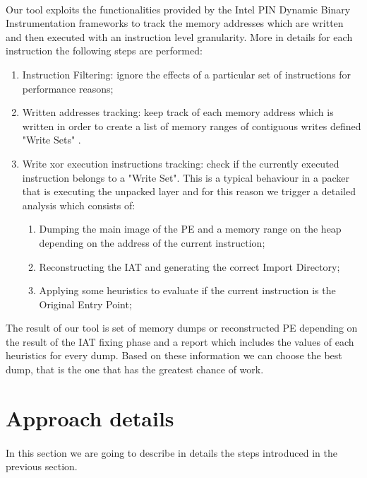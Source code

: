 \paragraph{}
Our tool exploits the functionalities provided by the Intel PIN Dynamic Binary Instrumentation frameworks to track the memory addresses which are written and then executed with an instruction level granularity.
More in details for each instruction the following steps are performed:
\begin{enumerate}
\item Instruction Filtering: ignore the effects of a particular set of instructions for performance reasons;
\item Written addresses tracking: keep track of each memory address which is written in order to create a list of memory ranges of contiguous writes defined "Write Sets" .
\item Write xor execution instructions tracking: check if the currently executed instruction belongs to a "Write Set". This is a typical behaviour in a packer that is executing the unpacked layer and for this reason we trigger a detailed analysis which consists of:
	\begin{enumerate}
	\item Dumping the main image of the PE and a memory range on the heap depending on the address of the current instruction;
	\item Reconstructing the IAT and generating the correct  Import Directory;
	\item Applying some heuristics to evaluate if the current instruction is the Original Entry Point;
	\end{enumerate}
\end{enumerate}
The result of our tool is set of memory dumps or reconstructed PE depending on the result of the IAT fixing phase and a report which includes the values of each heuristics for every dump. Based on these information we can choose the best dump, that is the one that has the greatest chance of work.\\

\section{Approach details}
\paragraph{}
In this section we are going to describe in details the steps introduced in the previous section.
